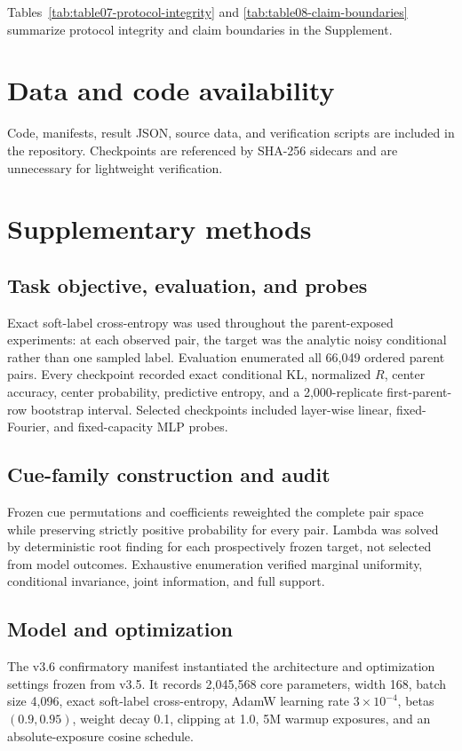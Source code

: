 \documentclass[10pt]{article}
\begin{document}
Tables~\ref{tab:table07-protocol-integrity} and
\ref{tab:table08-claim-boundaries} summarize protocol integrity and claim
boundaries in the Supplement.

\section{Data and code availability}
Code, manifests, result JSON, source data, and verification scripts are
included in the repository. Checkpoints are referenced by SHA-256 sidecars and
are unnecessary for lightweight verification.




\appendix
\section{Supplementary methods}
\subsection{Task objective, evaluation, and probes}
Exact soft-label cross-entropy was used throughout the parent-exposed
experiments: at each observed pair, the target was the analytic noisy
conditional rather than one sampled label. Evaluation enumerated all
66,049 ordered parent pairs. Every checkpoint recorded exact conditional KL,
normalized $R$, center accuracy, center probability, predictive entropy, and a
2,000-replicate first-parent-row bootstrap interval. Selected checkpoints
included layer-wise linear, fixed-Fourier, and fixed-capacity MLP probes.

\subsection{Cue-family construction and audit}
Frozen cue permutations and coefficients reweighted the complete pair space
while preserving strictly positive probability for every pair. Lambda was
solved by deterministic root finding for each prospectively frozen target, not
selected from model outcomes. Exhaustive enumeration verified marginal
uniformity, conditional invariance, joint information, and full support.

\subsection{Model and optimization}
The v3.6 confirmatory manifest instantiated the architecture and optimization
settings frozen from v3.5. It records
2,045,568 core
parameters, width 168, batch size
4,096, exact soft-label cross-entropy, AdamW
learning rate $3\times10^{-4}$,
betas
$(0.9,0.95)$, weight decay
0.1, clipping at 1.0,
5M warmup exposures, and an
absolute-exposure cosine schedule.
\end{document}

